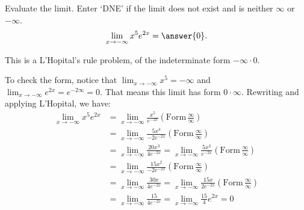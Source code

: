 \documentclass{ximera}
\author{Emma Smith Zbarsky\and Nela Lakos \and Bobby Ramsey}
\begin{document}
\begin{exercise}

Evaluate the limit. Enter `DNE' if the limit does not exist and is neither $\infty$ or $-\infty$. 
\[\lim_{x \to -\infty} x^5e^{2x} = \answer{0}.\]


\begin{hint}
This is a L'Hopital's rule problem, of the indeterminate form
$-\infty \cdot 0.$
\end{hint}

\begin{hint}
To check the form, notice that
$\displaystyle \lim_{x\to -\infty} x^5 = -\infty$ and
$\displaystyle \lim_{x\to -\infty} e^{2x} = e^{-2\infty} = 0$. That means this limit has form $0\cdot \infty$.
Rewriting and applying L'Hopital, we have: 
\begin{align*}
	\lim_{x\to -\infty} x^5e^{2x} &= \lim_{x\to -\infty} \frac{x^5}{e^{-2x}} \left(\text{Form} \, \frac{\infty}{\infty}\right)\\
	&= \lim_{x\to -\infty} \frac{5x^4}{-2e^{-2x}} \left(\text{Form} \, \frac{\infty}{\infty}\right)\\
	&= \lim_{x\to -\infty} \frac{20x^3}{4e^{-2x}} = \lim_{x\to -\infty} \frac{5x^3}{e^{-2x}} \left(\text{Form}\, \frac{\infty}{\infty}\right)\\
	&= \lim_{x\to -\infty} \frac{15x^2}{-2e^{-2x}}  \left(\text{Form}\, \frac{\infty}{\infty}\right)\\
	&= \lim_{x\to -\infty} \frac{30x}{4e^{-2x}}= \lim_{x\to -\infty} \frac{15x}{2e^{-2x}}  \left(\text{Form}\, \frac{\infty}{\infty}\right)\\
	&= \lim_{x\to -\infty} \frac{15}{4e^{-2x}} = \lim_{x\to -\infty} \frac{15}{4}e^{2x} = 0
\end{align*}
\end{hint}



\end{exercise}
\end{document}
